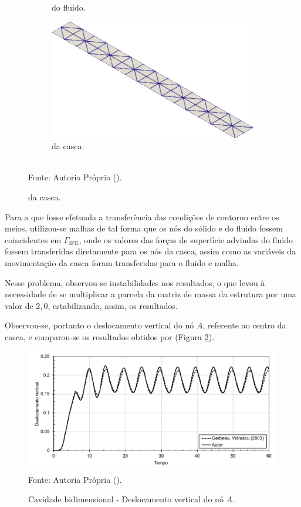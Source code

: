 \begin{figure}[h!]
\begin{subfigure}[b]{0.32\textwidth}
        \caption{do fluido.}
    \end{subfigure}
    \begin{subfigure}[b]{0.32\textwidth}
        \includegraphics[width=\linewidth]{Figuras/FSI-Cavity2D/shell-mesh.png}
        \caption{da casca.}
    \end{subfigure}
    \\Fonte: Autoria Própria (\the\year).
    \label{fig:Cavity2D-mesh}
\end{figure}

Para a que fosse efetuada a transferência das condições de contorno entre os meios, utilizou-se malhas de tal forma que os nós do sólido e do fluido fossem coincidentes em $\Gamma_\mathrm{IFE}$, onde os valores das forças de superfície advindas do fluido fossem transferidas diretamente para os nós da casca, assim como as variáveis da movimentação da casca foram transferidas para o fluido e malha.

Nesse problema, observou-se instabilidades nos resultados, o que levou à necessidade de se multiplicar a parcela da matriz de massa da estrutura por uma valor de $2,0$, estabilizando, assim, os resultados.

Observou-se, portanto o deslocamento vertical do nó $A$, referente ao centro da casca, e comparou-se os resultados obtidos por  (Figura \ref{fig:cavity2D-res}).

\begin{figure}[h!]
    \centering
    \caption{Cavidade bidimensional - Deslocamento vertical do nó $A$.}
    \includegraphics[width=.8\linewidth]{Figuras/FSI-Cavity2D/resultados.pdf}
    \\Fonte: Autoria Própria (\the\year).
    \label{fig:cavity2D-res}
\end{figure}

